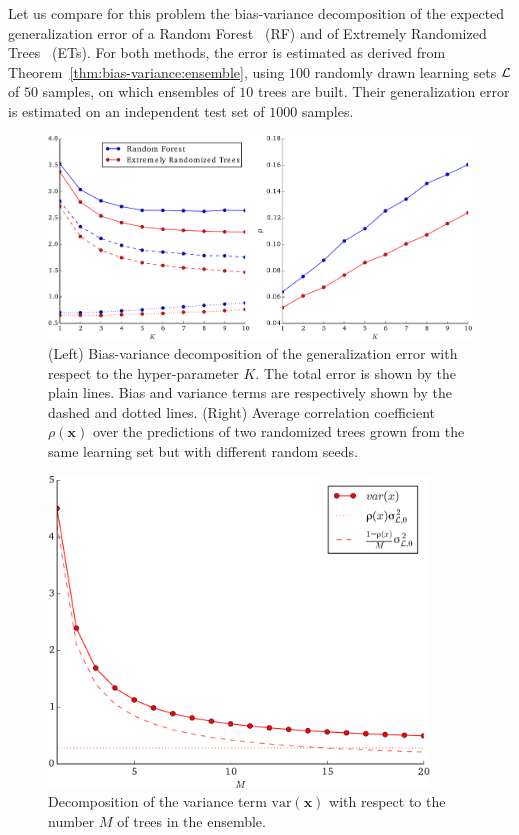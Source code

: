Let us compare for this problem the bias-variance decomposition of the expected
generalization error of a Random Forest~\citep{breiman:2001} (RF) and of
Extremely Randomized Trees~\citep{geurts:2006} (ETs). For both methods, the
error is estimated as derived from Theorem~\ref{thm:bias-variance:ensemble},
using $100$ randomly drawn learning sets ${\cal L}$ of $50$ samples, on which
ensembles of $10$ trees are built. Their generalization error is estimated on
an independent test set of $1000$ samples.

\begin{figure}
    \centering
    \includegraphics[width=\textwidth]{figures/ch4_correlation.pdf}
    \caption{(Left) Bias-variance decomposition of the generalization error
            with respect to the hyper-parameter $K$. The total error is shown by the plain
            lines. Bias and variance terms are respectively shown by the dashed and dotted
            lines.  (Right) Average correlation
            coefficient $\rho(\mathbf{x})$ over the predictions of two randomized trees
            grown from the same learning set but with different random seeds.}
    \label{fig:correlation}
\end{figure}
\begin{figure}
    \centering
    \includegraphics[width=0.9\textwidth]{figures/ch4_variance.pdf}
    \caption{Decomposition of the variance term $\text{var}(\mathbf{x})$ with respect to the number $M$ of trees in the ensemble.}
    \label{fig:variance}
\end{figure}

